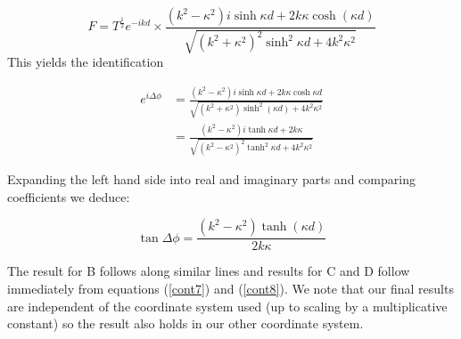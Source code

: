 \documentclass{article}
\begin{document}
\[
	F = T^{\frac{1}{2}}e^{-ikd} \times \frac{(k^2-\kappa^2)i\sinh{\kappa d}+2k\kappa \cosh(\kappa d)}{\sqrt{(k^2+\kappa^2)^2\sinh^{2}{\kappa d}+4k^2\kappa^2}}
\] 
This yields the identification

\begin{align}
	e^{i\Delta\phi} &= \frac{(k^2-\kappa^2)i\sinh{\kappa d}+2k\kappa \cosh{\kappa d}}{\sqrt{(k^2+\kappa^2)\sinh^{2}(\kappa d)+4k^2\kappa^2}} \\
			&= \frac{(k^2-\kappa^2)i\tanh{\kappa d}+2k\kappa}{\sqrt{(k^2-\kappa^2)^2\tanh^2{\kappa d}+4k^2\kappa^2}}
\end{align}

Expanding the left hand side into real and imaginary parts and comparing coefficients we deduce:

\[
	\tan{\Delta\phi} = \frac{(k^2-\kappa^2)\tanh(\kappa d)}{2k\kappa}
\] 

The result for B follows along similar lines and results for C and D follow immediately from equations (\ref{cont7}) and (\ref{cont8}). We note that our final results are independent of the coordinate system used (up to scaling by a multiplicative constant) so the result also holds in our other coordinate system.
\end{document}
